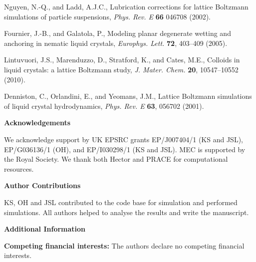\documentclass[12pt]{article}
\begin{document}
\begin{thebibliography}{99}
Nguyen, N.-Q., and Ladd, A.J.C.,
Lubrication corrections for lattice Boltzmann simulations of particle
suspensions,
\textit{Phys. Rev. E} \textbf{66} 046708 (2002).

Fournier, J.-B., and  Galatola, P.,
Modeling planar degenerate wetting and anchoring in nematic liquid
crystals,
\textit{Europhys. Lett.} \textbf{72}, 403--409 (2005).

Lintuvuori, J.S., Marenduzzo, D., Stratford, K., and Cates, M.E.,
Colloids in liquid crystals: a lattice Boltzmann study,
\textit{J. Mater. Chem.} \textbf{20}, 10547--10552 (2010).

Denniston, C.,  Orlandini, E., and  Yeomans, J.M.,
Lattice Boltzmann simulations of liquid crystal hydrodynamics,
\textit{Phys. Rev. E} \textbf{63}, 056702 (2001).



\end{thebibliography}
\noindent
\textbf{\large Acknowledgements}

\noindent
We acknowledge support by UK EPSRC grants EP/J007404/1 (KS and JSL), 
EP/G036136/1 (OH), and EP/I030298/1 (KS and JSL).
MEC is supported by the Royal Society.
We thank both Hector and PRACE for computational resources.

\bigskip
\noindent
\textbf{\large Author Contributions}

\noindent
KS, OH and JSL contributed to the code base for simulation and performed
simulations. All authors helped to analyse the results and write the
manuscript.

\bigskip
\noindent
\textbf{\large Additional Information}

\noindent
\textbf{Competing financial interests:} The authors declare no competing
financial interests.

\newpage
\end{document}
